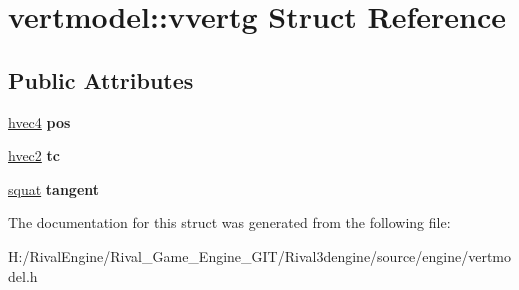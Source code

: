 \hypertarget{structvertmodel_1_1vvertg}{}\section{vertmodel\+:\+:vvertg Struct Reference}
\label{structvertmodel_1_1vvertg}
\subsection*{Public Attributes}
\begin{DoxyCompactItemize}
\item 
\mbox{\label{structvertmodel_1_1vvertg_a3883e342d5b1b365b7ef1e993791a5fc}} 
\hyperlink{structhvec4}{hvec4} {\bfseries pos}
\item 
\mbox{\label{structvertmodel_1_1vvertg_a70314d6dc9742673382a9e6058dafee3}} 
\hyperlink{structhvec2}{hvec2} {\bfseries tc}
\item 
\mbox{\label{structvertmodel_1_1vvertg_af797bb249d6698aa782921b7f84a37e4}} 
\hyperlink{structsquat}{squat} {\bfseries tangent}
\end{DoxyCompactItemize}


The documentation for this struct was generated from the following file\+:\begin{DoxyCompactItemize}
\item 
H\+:/\+Rival\+Engine/\+Rival\+\_\+\+Game\+\_\+\+Engine\+\_\+\+G\+I\+T/\+Rival3dengine/source/engine/vertmodel.\+h\end{DoxyCompactItemize}
